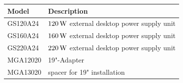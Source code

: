 \documentclass[a4paper, final, 12pt, oneside]{scrartcl}
\numberwithin{equation}{section}
\numberwithin{table}{section}
\numberwithin{figure}{section}
\begin{document}
\begin{table}[!hp]
  \begin{tabular}{ll}
    \toprule
    \textbf{Model} & \textbf{Description}\\
    \toprule
    GS120A24   & $\unit[120]{W}$ external desktop power supply unit \\
    GS160A24   & $\unit[160]{W}$ external desktop power supply unit \\
    GS220A24   & $\unit[220]{W}$ external desktop power supply unit \\
    MGA12020   & 19"-Adapter\footnotemark[1]\\
    MGA13020   & spacer for 19" installation\footnotemark[1] \\
    \bottomrule
  \end{tabular}
\end{table}


\FloatBarrier
\vfill
\end{document}
